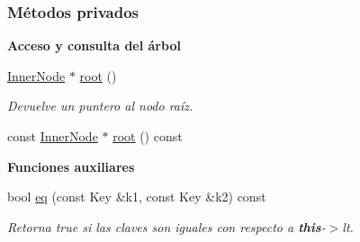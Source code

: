 \subsubsection*{\-Métodos privados}
\begin{Indent}{\bf \-Acceso y consulta del árbol}\par
\begin{DoxyCompactItemize}
\item 
\hyperlink{structaed2_1_1iterator_1_1InnerNode}{\-Inner\-Node} $\ast$ \hyperlink{classaed2_1_1iterator_aa442801bed510f7fde94e14bafada8a1_aa442801bed510f7fde94e14bafada8a1}{root} ()
\begin{DoxyCompactList}\small\item\em \-Devuelve un puntero al nodo raíz. \end{DoxyCompactList}\item 
const \hyperlink{structaed2_1_1iterator_1_1InnerNode}{\-Inner\-Node} $\ast$ \hyperlink{classaed2_1_1iterator_a888c520c5a85d62a8ce2159c6d22e439_a888c520c5a85d62a8ce2159c6d22e439}{root} () const 
\end{DoxyCompactItemize}
\end{Indent}
\begin{Indent}{\bf \-Funciones auxiliares}\par
\begin{DoxyCompactItemize}
\item 
bool \hyperlink{classaed2_1_1iterator_a0f44ecfde1e6a5dce5e37c0779ffefb7_a0f44ecfde1e6a5dce5e37c0779ffefb7}{eq} (const \-Key \&k1, const \-Key \&k2) const 
\begin{DoxyCompactList}\small\item\em \-Retorna true si las claves son iguales con respecto a {\bfseries this}-\/$>$lt. \end{DoxyCompactList}\end{DoxyCompactItemize}
\end{Indent}

